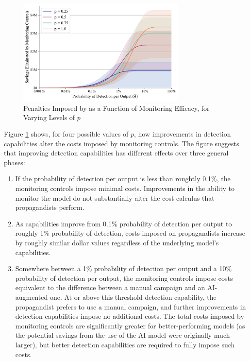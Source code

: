 \documentclass{article}
\begin{document}
\begin{figure}[h]
  \centering
  \includegraphics[width=0.75\textwidth]{figures/detection_penalties.pdf}
  \caption{Penalties Imposed by as a Function of Monitoring Efficacy, for Varying Levels of $p$}
  \label{fig:penalties}
\end{figure}

Figure \ref{fig:penalties} shows, for four possible values of $p$, how improvements in detection capabilities alter the costs imposed by monitoring controls. The figure suggests that improving detection capabilities has different effects over three general phases:

\begin{enumerate}
  \item If the probability of detection per output is less than roughtly 0.1\%, the monitoring controls impose minimal costs. Improvements in the ability to monitor the model do not substantially alter the cost calculus that propagandists perform.
  \item As capabilities improve from 0.1\% probability of detection per output to roughly 1\% probability of detection, costs imposed on propagandists increase by roughly similar dollar values regardless of the underlying model's capabilities. 
  \item Somewhere between a 1\% probability of detection per output and a 10\% probability of detection per output, the monitoring controls impose costs equivalent to the difference between a manual campaign and an AI-augmented one. At or above this threshold detection capability, the propagandist prefers to use a manual campaign, and further improvements in detection capabilities impose no additional costs. The total costs imposed by monitoring controls are significantly greater for better-performing models (as the potential savings from the use of the AI model were originally much larger), but better detection capabilities are required to fully impose such costs.  
\end{enumerate}
\end{document}

